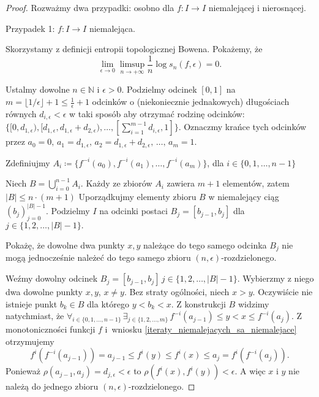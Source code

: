 \documentclass[licencjacka]{pwr_wmat_praca_dyplomowa}
\theoremstyle{plain}
\numberwithin{theorem}{chapter}
\theoremstyle{definition}
\numberwithin{theorem}{chapter}
\begin{document}
\begin{proof}
Rozważmy dwa przypadki: osobno dla $f: I \rightarrow I$ niemalejącej i nierosnącej.
\item[Przypadek 1: $f: I \rightarrow I$ niemalejąca.]

Skorzystamy z definicji entropii topologicznej Bowena. Pokażemy, że 
$$\lim_{\epsilon \rightarrow 0} \limsup_{n \rightarrow +\infty} \frac{1}{n} \log s_n(f, \epsilon) = 0.$$


Ustalmy dowolne $n \in \mathbb{N}$ i $\epsilon > 0.$ Podzielmy odcinek $[0, 1]$ na $m = \lfloor 1/\epsilon \rfloor + 1 \leq \frac{1}{\epsilon} + 1$ odcinków o (niekoniecznie jednakowych) długościach równych $d_{i,\epsilon} < \epsilon$ w taki sposób aby otrzymać rodzinę odcinków: $\{ [0, d_{1,\epsilon}), [d_{1,\epsilon}, d_{1,\epsilon} + d_{2, \epsilon}), \ldots, [\sum_{i=1}^{m-1} d_{i, \epsilon}, 1] \}.$ Oznaczmy krańce tych odcinków przez $a_0=0, \, a_1 = d_{1,\epsilon}, \, a_2 = d_{1,\epsilon} + d_{2,\epsilon}, \, \ldots, \, a_m = 1.$ 

Zdefiniujmy $A_i \coloneqq \{f^{-i}(a_0), f^{-i}(a_1), \ldots, f^{-i}(a_m)\}$, dla $i \in \{0, 1, \ldots, n-1\}$

Niech $B = \bigcup_{i=0}^{n-1} A_i.$ Każdy ze zbiorów $A_i$ zawiera $m+1$ elementów, zatem $|B| \leq n \cdot (m+1)$ Uporządkujmy elementy zbioru $B$ w niemalejący ciąg $(b_j)_{j=0}^{|B|-1}.$ Podzielmy $I$ na odcinki postaci $B_j = [b_{j-1}, b_{j}]$ dla $j \in \{1, 2, \ldots, |B|-1\}.$  

Pokażę, że dowolne dwa punkty $x, y$ należące do tego samego odcinka $B_j$ nie mogą jednocześnie należeć do tego samego zbioru $(n, \epsilon)$-rozdzielonego.

Weźmy dowolny odcinek $B_j = [b_{j-1}, b_{j}] \, j \in \{1, 2, \ldots, |B|-1\}.$ Wybierzmy z niego dwa dowolne punkty $x, y$, $x \neq y$. Bez straty ogólności, niech $x > y.$ Oczywiście nie istnieje punkt $b_k \in B$ dla którego $y < b_k < x.$ Z konstrukcji $B$ widzimy natychmiast, że $\forall_{i \in \{0, 1, \ldots, n-1\}} \, \exists_{j \in \{1,2,\ldots,m\}} \, f^{-i}(a_{j-1}) \leq y < x \leq f^{-i}(a_j)$. Z monotoniczności funkcji $f$ i~wniosku \ref{iteraty_niemalejacych_sa_niemalejace} otrzymujemy 
$$f^i(f^{-i}(a_{j-1})) =  a_{j-1} \leq f^i(y) \leq f^i(x) \leq a_j = f^i(f^{-i}(a_j)).$$
Ponieważ $\rho(a_{j-1}, a_j) = d_{j,\epsilon} < \epsilon$ to  $\rho(f^i(x), f^i(y)) < \epsilon.$ A więc $x$ i $y$ nie należą do jednego zbioru $(n, \epsilon)$-rozdzielonego.




\end{proof}
\end{document}
